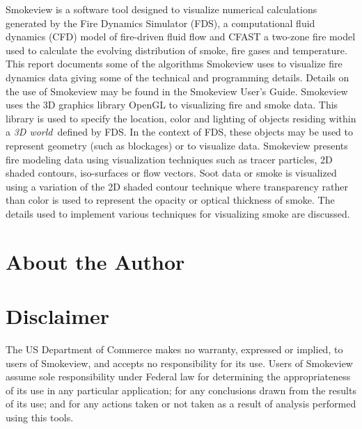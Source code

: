 \documentclass[11pt,twoside]{book}
\begin{document}
Smokeview is a software tool designed to visualize numerical
calculations generated by the Fire Dynamics Simulator (FDS), a
computational fluid dynamics (CFD) model of fire-driven fluid flow
and CFAST a two-zone fire model used to calculate the evolving
distribution of smoke, fire gases and temperature. This report
documents some of the algorithms Smokeview uses to visualize fire
dynamics data giving some of the technical and programming
details. Details on the use of Smokeview may be found in the
Smokeview User's Guide. Smokeview uses the 3D graphics library
OpenGL to visualizing fire and smoke data. This library is used to
specify the location, color and lighting of objects residing
within a {\em 3D world}\ defined by FDS. In the context of FDS,
these objects may be used to represent geometry (such as
blockages) or to visualize data. Smokeview presents fire modeling
data using visualization techniques such as tracer particles, 2D
shaded contours, iso-surfaces or flow vectors.  Soot data or smoke
is visualized using a variation of the 2D shaded contour technique
where transparency rather than color is used to represent the
opacity or optical thickness of smoke.  The details used to
implement various techniques for visualizing smoke are discussed.


\chapter{About the Author}

\begin{description}
\gforneybio
\end{description}

%
%

\chapter{Disclaimer}

The US Department of Commerce makes no warranty, expressed or
implied, to users of Smokeview, and accepts no responsibility for
its use. Users of Smokeview assume sole responsibility under
Federal law for determining the appropriateness of its use in any
particular application; for any conclusions drawn from the results
of its use; and for any actions taken or not taken as a result of
analysis performed using this tools.
\end{document}

